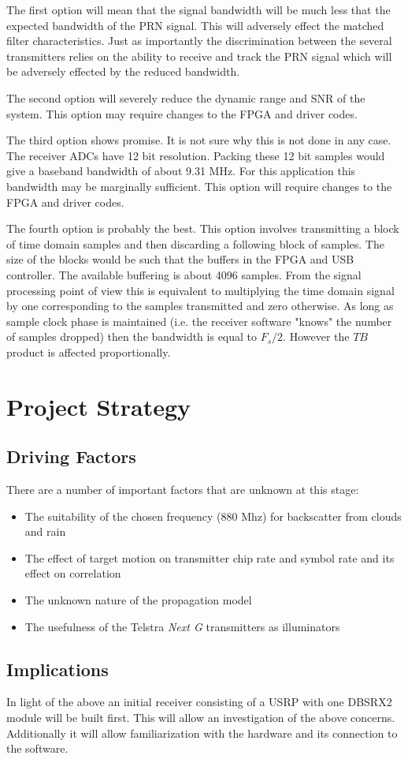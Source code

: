 \documentclass[a4paper]{report}
\numberwithin{equation}{chapter}
\begin{document}
The first option will mean that the signal bandwidth will be much less that the expected bandwidth of the PRN signal. This will adversely effect the matched filter characteristics. Just as importantly the discrimination between the several transmitters relies on the ability to receive and track the PRN signal which will be adversely effected by the reduced bandwidth.

\bigskip

The second option will severely reduce the dynamic range and SNR of the system. This option may require changes to the FPGA and driver codes.

\bigskip

The third option shows promise. It is not sure why this is not done in any case. The receiver ADCs have 12 bit resolution. Packing these 12 bit samples would give a baseband bandwidth of about 9.31 MHz. For this application this bandwidth may be marginally sufficient. This option will require changes to the FPGA and driver codes.

\bigskip

The fourth option is probably the best. This option involves transmitting a block of time domain samples and then discarding a following block of samples. The size of the blocks would be such that the buffers in the FPGA and USB controller. The available buffering is about 4096 samples. From the signal processing point of view this is equivalent to multiplying the time domain signal by one corresponding to the samples transmitted and zero otherwise. As long as sample clock phase is maintained (i.e. the receiver software "knows" the number of samples dropped) then the bandwidth is equal to $F_s / 2$. However the $TB$ product is affected proportionally.

\clearpage\setcounter{page}{1}
\chapter[Project Strategy]{Project Strategy}
\section[Driving Factors]{Driving Factors}
There are a number of important factors that are unknown at this stage:
\begin{itemize}
\item{The suitability of the chosen frequency (880 Mhz) for backscatter from clouds and rain}
\item{The effect of target motion on transmitter chip rate and symbol rate and its effect on correlation}
\item{The unknown nature of the propagation model}
\item{The usefulness of the Telstra \textit{Next G} transmitters as illuminators}
\end{itemize}

\section[Implications]{Implications}
In light of the above an initial receiver consisting of a USRP with one DBSRX2 module will be built first. This will allow an investigation of the above concerns. Additionally it will allow familiarization with the hardware and its connection to the software.
\end{document}
